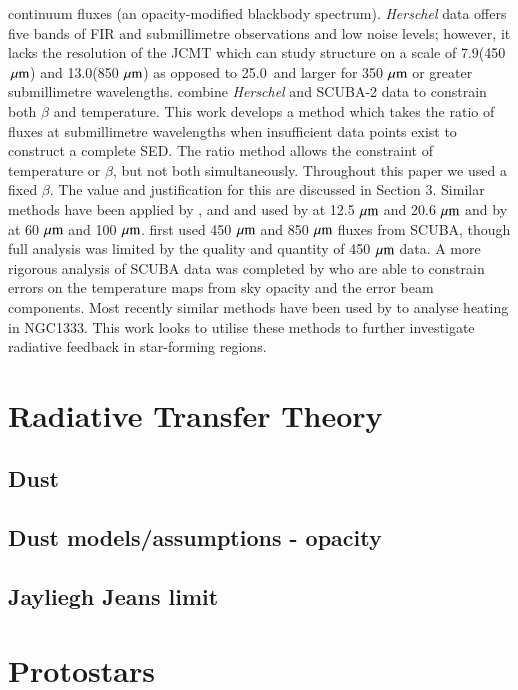 continuum fluxes (an opacity-modified blackbody spectrum). \emph{Herschel} data offers five bands of FIR and submillimetre 
observations and low noise levels; however, it lacks the resolution of the JCMT which can study structure on a scale of 
7.9\arcsec (450\,$\,\mu\rm{m}$) and 13.0\arcsec (850\,$\,\mu\rm{m}$) \citep{Dempsey:2013uq} as opposed to 25.0\arcsec\ and larger 
for 350\,$\,\mu\rm{m}$ or greater submillimetre wavelengths. \cite{Sadavoy:2013qf} combine \emph{Herschel} and SCUBA-2 
data to constrain both $\beta$ and temperature.
This work develops a method which takes the ratio of fluxes at submillimetre wavelengths when insufficient data points exist 
to construct a complete SED. The ratio method allows the constraint of temperature or $\beta$, but not both simultaneously. 
Throughout this paper we used a fixed $\beta$. The value and justification for this are discussed in Section 3. Similar methods 
have been applied by \cite{Wood:1994qf}, \cite{Arce:1999bh} and \cite{Font:2001cr} and used by \cite{Kraemer:2003uf} 
at 12.5\,$\,\mu\rm{m}$ and 20.6\,$\,\mu\rm{m}$ and by \cite{Schnee:2005zr} at 60\,$\,\mu\rm{m}$ and 100\,$\,\mu\rm{m}$. \cite{Mitchell:2001ve} 
first used 450\,$\,\mu\rm{m}$ and 850\,$\,\mu\rm{m}$ fluxes from SCUBA, though full analysis was limited by the quality and quantity of 
450\,$\,\mu\rm{m}$ data. A more rigorous analysis of SCUBA data was completed by \cite{Reid:2005ly} who are able to constrain 
errors on the temperature maps from sky opacity and the error beam components. Most recently similar methods have 
been used by \cite{Hatchell:2013ij} to analyse heating in NGC1333. This work looks to utilise these methods to further 
investigate radiative feedback in star-forming regions. 

\section{Radiative Transfer Theory}
\subsection{Dust}
\subsection{Dust models/assumptions - opacity}
\subsection{Jayliegh Jeans limit}

\section{Protostars}
